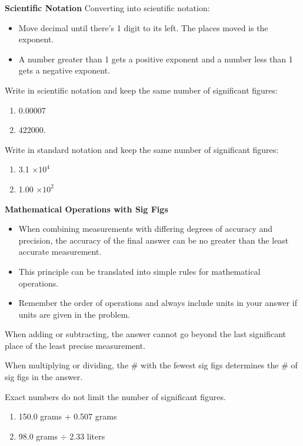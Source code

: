 \documentclass[../hchem.tex]{subfiles}
\begin{document}
\textbf{Scientific Notation}
Converting into scientific notation:
\begin{itemize}
    \item Move decimal until there's 1 digit to its left. The places moved is the exponent.
    \item A number greater than 1 gets a positive exponent and a number less than 1 gets a negative exponent.
\end{itemize}

\ex Write in scientific notation and keep the same number of significant figures:
\begin{enumerate}
    \item 0.00007
    \item 422000.
\end{enumerate}

\ex Write in standard notation and keep the same number of significant figures:
\begin{enumerate}
    \item 3.1 $\times 10^4$
    \item 1.00 $\times 10^2$
\end{enumerate}

\textbf{Mathematical Operations with Sig Figs}
\begin{itemize}
    \item When combining measurements with differing degrees of accuracy and precision, the 
    accuracy of the final answer can be no greater than the least accurate measurement.
    \item This principle can be translated into simple rules for mathematical operations.
    \item Remember the order of operations and always include units in your answer if units are given in the problem.
\end{itemize}

When adding or subtracting, the answer cannot go beyond the last significant place of the least precise measurement.

When multiplying or dividing, the \# with the fewest sig figs determines the \# of sig figs in the answer.

Exact numbers do not limit the number of significant figures.

\ex 
\begin{enumerate}
    \item 150.0 grams + 0.507 grams
    \item 98.0 grams $\div$ 2.33 liters
\end{enumerate}
\end{document}
